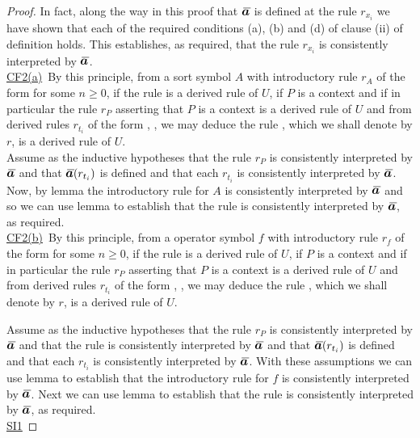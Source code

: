 \begin{proof}
In fact, along the way in this proof that $\Ibar$ is defined at the rule $r_{x_i}$ we have shown that each of the required conditions 
 (a), (b) and (d) of clause (ii) of definition  holds. This establishes, as required,
that the rule  $r_{x_i}$ is consistently interpreted by $\Ibar$. \\
\underline{CF2(a)}\ By this principle, from a sort symbol $A$ with introductory rule $r_A$ of the form  for some $n \geq 0$, if the rule  is a derived rule of $U$,
if $P$ is a context and if in particular the rule $r_P$ asserting that $P$ is a context is a derived rule of $U$
and from derived rules $r_{t_i}$ of the form , \foreachi, we may deduce
the rule , which we shall denote by $r$, is a derived rule of $U$. \\

Assume as the inductive hypotheses that the rule $r_P$ is consistently interpreted by $\Ibar$ and that 
$\Ibar(r_{t_i})$ is defined \foreachi and that each $r_{t_i}$ is consistently
interpreted by $\Ibar$.
Now, by lemma  the introductory rule for $A$ is consistently interpreted by $\Ibar$
and so we can use lemma 
to establish that the rule  is consistently interpreted by $\Ibar$, as required. \\
\underline{CF2(b)}\ By this principle, from a operator symbol $f$ with introductory rule $r_f$ of the form  for some $n \geq 0$, if the rule  is a derived rule of $U$,
if $P$ is a context and if in particular the rule $r_P$ asserting that $P$ is a context is a derived rule of $U$
and from derived rules $r_{t_i}$ of the form , \foreachi, we may deduce
the rule , which we shall denote by $r$, is a derived rule of $U$. 

Assume as the inductive hypotheses  that the rule $r_P$ is consistently interpreted by $\Ibar$ and that 
the rule  is consistently interpreted by $\Ibar$
and that $\Ibar(r_{t_i})$ is defined \foreachi and that each $r_{t_i}$ is consistently
interpreted by $\Ibar$.
With these assumptions we can use lemma  to establish that the introductory rule for $f$ is consistently interpreted by $\Ibar$.
Next we can use lemma 
to establish that the rule  is consistently interpreted by $\Ibar$, as required. \\
%
\underline{SI1} 
\newcommand{\SIonesourcelhs}{\gatdisplayrule{\yOmega{m}}{\isT{\Omega}}}
\newcommand{\SIonesourcerhs}{\gatdisplayrule{\yOmega{m}}{\isT{\Omega'}}}
\newcommand{\SIoneconclusion}{\gatdisplayrule{Q}{\Omega[\SUBsFORy{m}]=\Omega'[\SUBspFORy{m}]}}
\newcommand{\SIoneconclusionlhs}{\ZOmegaSUBsmFORym}
\newcommand{\SIoneconclusionrhs}{\gatdisplayrule{Q}{\isT{\Omega'[\SUBspFORy{m}]}}}


\end{proof}
